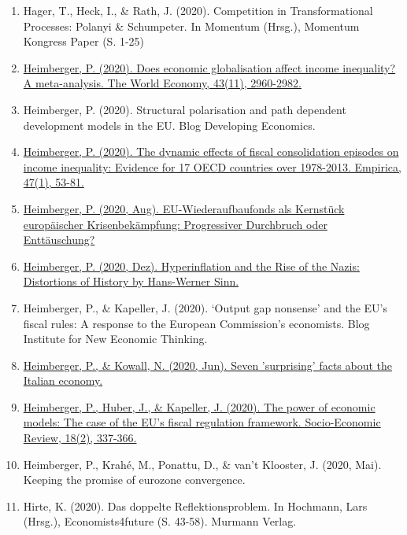 \begin{enumerate}
	 \item Hager, T., Heck, I., \& Rath, J. (2020). Competition in Transformational Processes: Polanyi \& Schumpeter. In Momentum (Hrsg.), Momentum Kongress Paper (S. 1-25)
	 \item \href{https://doi.org/10.1111/twec.13007}{Heimberger, P. (2020). Does economic globalisation affect income inequality? A meta-analysis. The World Economy, 43(11), 2960-2982.}
	 \item Heimberger, P. (2020). Structural polarisation and path dependent development models in the EU. Blog Developing Economics.
	 \item \href{https://doi.org/10.1007/s10663-018-9404-z}{Heimberger, P. (2020). The dynamic effects of fiscal consolidation episodes on income inequality: Evidence for 17 OECD countries over 1978-2013. Empirica, 47(1), 53-81.}
	 \item \href{https://www.fes.de/themen/finanzen/eu-wiederaufbaufonds-als-kernstueck-europaeischer-krisenbekaempfung-progressiver-durchbruch-oder-enttaeuschung}{Heimberger, P. (2020, Aug). EU-Wiederaufbaufonds als Kernstück europäischer Krisenbekämpfung: Progressiver Durchbruch oder Enttäuschung?}
	 \item \href{https://braveneweurope.com/philipp-heimberger-hyperinflation-and-the-rise-of-the-nazis-distortions-of-history-by-hans-werner-sinn}{Heimberger, P. (2020, Dez). Hyperinflation and the Rise of the Nazis: Distortions of History by Hans-Werner Sinn.}
	 \item Heimberger, P., \& Kapeller, J. (2020). ‘Output gap nonsense’ and the EU’s fiscal rules: A response to the European Commission’s economists. Blog Institute for New Economic Thinking.
	 \item \href{https://www.socialeurope.eu/seven-surprising-facts-about-the-italian-economy?fbclid=IwAR3N2ufodTGvgk_hgf1-UsJaioWOVTayvQ0QQmsaCUk5Gkym1usHuvRC184}{Heimberger, P., \& Kowall, N. (2020, Jun). Seven ’surprising’ facts about the Italian economy.}
	 \item \href{https://doi.org/10.1093/ser/mwz052}{Heimberger, P., Huber, J., \& Kapeller, J. (2020). The power of economic models: The case of the EU's fiscal regulation framework. Socio-Economic Review, 18(2), 337-366.}
	 \item Heimberger, P., Krahé, M., Ponattu, D., \& van't Klooster, J. (2020, Mai). Keeping the promise of eurozone convergence.
	 \item Hirte, K. (2020). Das doppelte Reflektionsproblem. In Hochmann, Lars (Hrsg.), Economists4future (S. 43-58). Murmann Verlag.

\end{enumerate}
